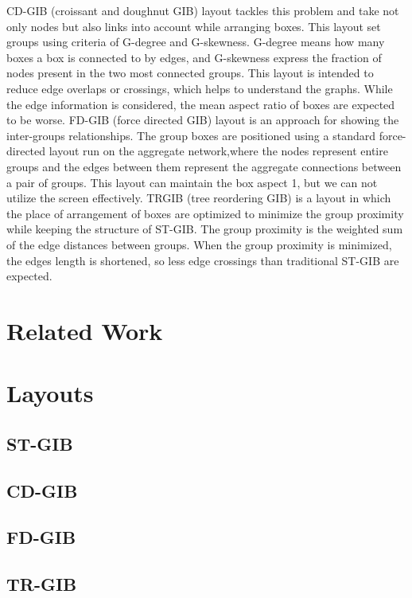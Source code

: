 \documentclass{llncs}
\begin{document}
CD-GIB (croissant and doughnut GIB) layout tackles this problem and take not only nodes but also links into account while arranging boxes. This layout set groups using criteria of G-degree and G-skewness. G-degree means how many boxes a box is connected to by edges, and G-skewness express the fraction of nodes present in the two most connected groups. This layout is intended to reduce edge overlaps or crossings, which helps to understand the graphs. While the edge information is considered, the mean aspect ratio of boxes are expected to be worse.
FD-GIB (force directed GIB) layout is an approach for showing the inter-groups relationships. The group boxes are positioned using a standard force-directed layout run on the aggregate network,where the nodes represent entire groups and the edges between them represent the aggregate connections between a pair of groups. This layout can maintain the box aspect 1, but we can not utilize the screen effectively.
TRGIB (tree reordering GIB) is a layout in which the place of arrangement of boxes are optimized to minimize the group proximity while keeping the structure of ST-GIB. The group proximity is the weighted sum of the edge distances between groups. When the group proximity is minimized, the edges length is shortened, so less edge crossings than traditional ST-GIB are expected.


%
\section{Related Work}
%


%
\section{Layouts}
%
\subsection{ST-GIB}

\subsection{CD-GIB}

\subsection{FD-GIB}

\subsection{TR-GIB}
\end{document}
